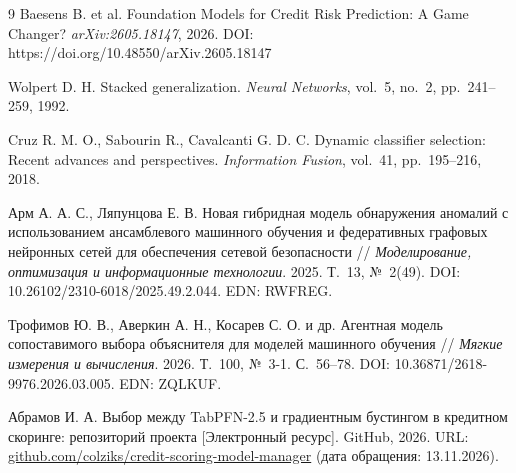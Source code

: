 \documentclass{misisarticle}
\begin{document}
\begin{thebibliography}{9}
 Baesens B. et al. Foundation Models for Credit Risk Prediction: A Game Changer? \textit{arXiv:2605.18147}, 2026. DOI: https://doi.org/10.48550/arXiv.2605.18147

 Wolpert D. H. Stacked generalization. \textit{Neural Networks}, vol.~5, no.~2, pp.~241--259, 1992.

 Cruz R. M. O., Sabourin R., Cavalcanti G. D. C. Dynamic classifier selection: Recent advances and perspectives. \textit{Information Fusion}, vol.~41, pp.~195--216, 2018.

 Арм А. А. С., Ляпунцова Е. В. Новая гибридная модель обнаружения аномалий с использованием ансамблевого машинного обучения и федеративных графовых нейронных сетей для обеспечения сетевой безопасности // \textit{Моделирование, оптимизация и информационные технологии}. 2025. Т.~13, №~2(49). DOI: 10.26102/2310-6018/2025.49.2.044. EDN: RWFREG.

 Трофимов Ю. В., Аверкин А. Н., Косарев С. О. и др. Агентная модель сопоставимого выбора объяснителя для моделей машинного обучения // \textit{Мягкие измерения и вычисления}. 2026. Т.~100, №~3-1. С.~56--78. DOI: 10.36871/2618-9976.2026.03.005. EDN: ZQLKUF.

 Абрамов И. А. Выбор между TabPFN-2.5 и градиентным бустингом в кредитном скоринге: репозиторий проекта [Электронный ресурс]. GitHub, 2026. URL: \href{https://github.com/colziks/credit-scoring-model-manager}{github.com/colziks/credit-scoring-model-manager} (дата обращения: 13.11.2026).

\end{thebibliography}
\end{document}
